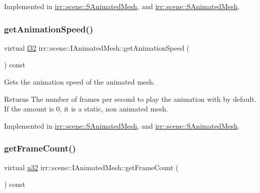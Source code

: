 Implemented in \hyperlink{structirr_1_1scene_1_1SAnimatedMesh_aa6b6302dad72761e22ba10cc4486b4c8}{irr\+::scene\+::\+S\+Animated\+Mesh}, and \hyperlink{structirr_1_1scene_1_1SAnimatedMesh_aa6b6302dad72761e22ba10cc4486b4c8}{irr\+::scene\+::\+S\+Animated\+Mesh}.

\mbox{\label{classirr_1_1scene_1_1IAnimatedMesh_acb4249295319c8240d5bedc167417435}} 
\subsubsection{\texorpdfstring{get\+Animation\+Speed()}{getAnimationSpeed()}\hspace{0.1cm}{\footnotesize\ttfamily [2/2]}}
{\footnotesize\ttfamily virtual \hyperlink{namespaceirr_a0277be98d67dc26ff93b1a6a1d086b07}{f32} irr\+::scene\+::\+I\+Animated\+Mesh\+::get\+Animation\+Speed (\begin{DoxyParamCaption}{ }\end{DoxyParamCaption}) const\hspace{0.3cm}{\ttfamily [pure virtual]}}



Gets the animation speed of the animated mesh. 

\begin{DoxyReturn}{Returns}
The number of frames per second to play the animation with by default. If the amount is 0, it is a static, non animated mesh. 
\end{DoxyReturn}


Implemented in \hyperlink{structirr_1_1scene_1_1SAnimatedMesh_aa6b6302dad72761e22ba10cc4486b4c8}{irr\+::scene\+::\+S\+Animated\+Mesh}, and \hyperlink{structirr_1_1scene_1_1SAnimatedMesh_aa6b6302dad72761e22ba10cc4486b4c8}{irr\+::scene\+::\+S\+Animated\+Mesh}.

\mbox{\label{classirr_1_1scene_1_1IAnimatedMesh_a2ec99aba081e9f37802e8ea9cd65629b}} 
\subsubsection{\texorpdfstring{get\+Frame\+Count()}{getFrameCount()}\hspace{0.1cm}{\footnotesize\ttfamily [1/2]}}
{\footnotesize\ttfamily virtual \hyperlink{namespaceirr_a0416a53257075833e7002efd0a18e804}{u32} irr\+::scene\+::\+I\+Animated\+Mesh\+::get\+Frame\+Count (\begin{DoxyParamCaption}{ }\end{DoxyParamCaption}) const\hspace{0.3cm}{\ttfamily [pure virtual]}}



